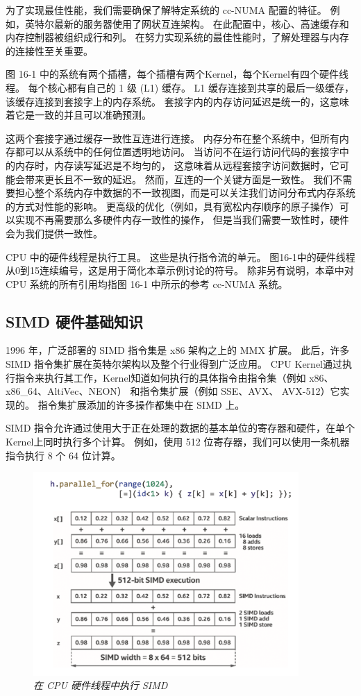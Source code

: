 为了实现最佳性能，我们需要确保了解特定系统的 cc-NUMA 配置的特征。 
例如，英特尔最新的服务器使用了网状互连架构。 
在此配置中，核心、高速缓存和内存控制器被组织成行和列。 
在努力实现系统的最佳性能时，了解处理器与内存的连接性至关重要。

图 16-1 中的系统有两个插槽，每个插槽有两个Kernel，每个Kernel有四个硬件线程。 
每个核心都有自己的 1 级 (L1) 缓存。 L1 缓存连接到共享的最后一级缓存，该缓存连接到套接字上的内存系统。 
套接字内的内存访问延迟是统一的，这意味着它是一致的并且可以准确预测。

这两个套接字通过缓存一致性互连进行连接。 内存分布在整个系统中，但所有内存都可以从系统中的任何位置透明地访问。 
当访问不在运行访问代码的套接字中的内存时，内存读写延迟是不均匀的，
这意味着从远程套接字访问数据时，它可能会带来更长且不一致的延迟。 
然而，互连的一个关键方面是一致性。 
我们不需要担心整个系统内存中数据的不一致视图，而是可以关注我们访问分布式内存系统的方式对性能的影响。 
更高级的优化（例如，具有宽松内存顺序的原子操作）可以实现不再需要那么多硬件内存一致性的操作，
但是当我们需要一致性时，硬件会为我们提供一致性。

CPU 中的硬件线程是执行工具。 这些是执行指令流的单元。 
图16-1中的硬件线程从0到15连续编号，这是用于简化本章示例讨论的符号。 
除非另有说明，本章中对 CPU 系统的所有引用均指图 16-1 中所示的参考 cc-NUMA 系统。

\subsection{SIMD 硬件基础知识}
1996 年，广泛部署的 SIMD 指令集是 x86 架构之上的 MMX 扩展。 
此后，许多 SIMD 指令集扩展在英特尔架构以及整个行业得到广泛应用。 
CPU Kernel通过执行指令来执行其工作，Kernel知道如何执行的具体指令由指令集（例如 x86、x86\_64、AltiVec、NEON）
和指令集扩展（例如 SSE、AVX、 AVX-512）它实现的。 指令集扩展添加的许多操作都集中在 SIMD 上。

SIMD 指令允许通过使用大于正在处理的数据的基本单位的寄存器和硬件，在单个Kernel上同时执行多个计算。 
例如，使用 512 位寄存器，我们可以使用一条机器指令执行 8 个 64 位计算。

\begin{figure}[H]
	\centering
	\includegraphics[width=0.9\textwidth]{figs/F16.2.png}
	\caption{\textit{在 CPU 硬件线程中执行 SIMD }}
\end{figure}


